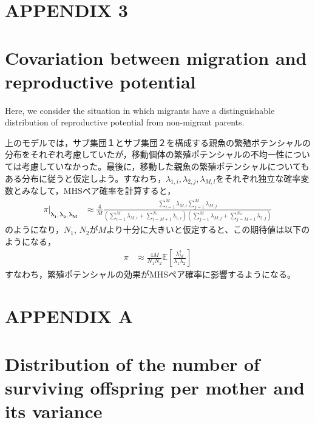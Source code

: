 \documentclass[12pt, English]{article}
\begin{document}
\begin{spacing}{1.9}
\section*{APPENDIX 3}

\section*{Covariation between migration and reproductive potential}

Here, we consider the situation in which migrants have a distinguishable distribution of reproductive potential from non-migrant parents. 

上のモデルでは，サブ集団１とサブ集団２を構成する親魚の繁殖ポテンシャルの分布をそれぞれ考慮していたが，移動個体の繁殖ポテンシャルの不均一性については考慮していなかった。最後に，移動した親魚の繁殖ポテンシャルについてもある分布に従うと仮定しよう。すなわち，$\lambda_{1,i}, \lambda_{2,j}, \lambda_{M,l}$をそれぞれ独立な確率変数とみなして，MHSペア確率を計算すると，
\begin{align}
\pi | _{\boldsymbol{\lambda_1, \lambda_2, \lambda_M}} &\approx \frac{4}{M} \frac{ \sum_{i=1}^M \lambda_{M,i} \sum_{j=1}^M \lambda_{M,j} } {\left(\sum_{i=1}^{M} \lambda_{M,i} + \sum_{i=M+1}^{N_1} \lambda_{1,i}\right) \left(\sum_{j=1}^{M} \lambda_{M,j} + \sum_{j=M+1}^{N_2} \lambda_{2,j}\right) } 
\end{align}
のようになり，$N_1$, $N_2$が$M$より十分に大きいと仮定すると、この期待値は以下のようになる，
\begin{align}
\pi &\approx \frac{4M}{N_{1}N_{2}} \mathbb{E}\left[ \frac{ \lambda_M^2 }{\lambda_1\lambda_2} \right]
\label{5-1}
\end{align}
すなわち，繁殖ポテンシャルの効果がMHSペア確率に影響するようになる。


\section*{APPENDIX A}
\setcounter{equation}{0}

\section*{Distribution of the number of surviving offspring per mother and its variance}

\renewcommand{\theequation}{A\arabic{equation}}


\end{spacing}
\end{document}
